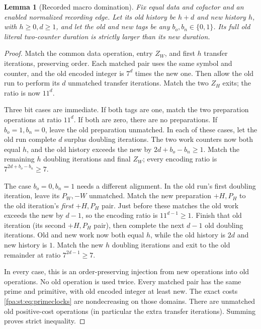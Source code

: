 \documentclass[11pt,a4paper]{article}
\numberwithin{equation}{section}
\newtheorem{lemma}[theorem]{Lemma}
\begin{document}
\begin{lemma}[Recorded macro domination]
\label{fpa:st:lem:dominance}
Fix equal data and cofactor and an enabled normalized recording edge.
Let its old history be $h+d$ and new history $h$, with $h\geq0,d\geq1$,
and let the old and new tags be any $b_o,b_n\in\{0,1\}$. Its full old
literal two-counter duration is strictly larger than its new duration.
\end{lemma}
\begin{proof}
Match the common data operation, entry $Z_W$, and first $h$ transfer
iterations, preserving order. Each matched pair uses the same symbol and
counter, and the old encoded integer is $7^d$ times the new one. Then allow
the old run to perform its $d$ unmatched transfer iterations. Match the two
$Z_H$ exits; the ratio is now $11^d$.

Three bit cases are immediate. If both tags are one, match the two
preparation operations at ratio $11^d$. If both are zero, there are no
preparations. If $b_o=1,b_n=0$, leave the old preparation unmatched. In each
of these cases, let the old run complete $d$ surplus doubling iterations.
The two work counters now both equal $h$, and the old history exceeds the
new by $2d+b_o-b_n\geq1$. Match the remaining $h$ doubling iterations and
final $Z_W$; every encoding ratio is $7^{2d+b_o-b_n}\geq7$.

The case $b_o=0,b_n=1$ needs a different alignment. In the old run's first
doubling iteration, leave its $P_W,-W$ unmatched. Match the new preparation
$+H,P_H$ to the old iteration's \emph{first} $+H,P_H$ pair. Just before
these matches the old work exceeds the new by $d-1$, so the encoding ratio
is $11^{d-1}\geq1$. Finish that old iteration (its second $+H,P_H$ pair),
then complete the next $d-1$ old doubling iterations. Old and new work now
both equal $h$, while the old history is $2d$ and new history is $1$.
Match the new $h$ doubling iterations and exit to the old remainder at
ratio $7^{2d-1}\geq7$.

In every case, this is an order-preserving injection from new operations
into old operations. No old operation is used twice. Every matched pair has
the same prime and primitive, with old encoded integer at least new. The
exact costs \eqref{fpa:st:eq:primeclocks} are nondecreasing on those domains.
There are unmatched old positive-cost operations (in particular the extra
transfer iterations). Summing proves strict inequality.
\end{proof}
\end{document}
